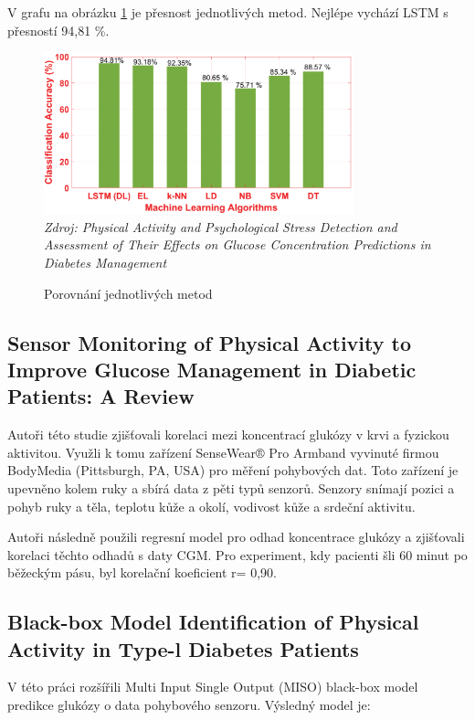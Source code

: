 V grafu na obrázku \ref{fig:analyza:su3} je přesnost jednotlivých metod. Nejlépe vychází LSTM s přesností 94,81 \%.

\begin{figure}[H]
\caption{Porovnání jednotlivých metod}
\label{fig:analyza:su3}
\centering
\includegraphics[width=0.8\textwidth]{img/analyzaPA/su3.png}\\
\textit{Zdroj: Physical Activity and Psychological Stress Detection and Assessment of Their Effects on Glucose Concentration Predictions in Diabetes Management \citep{analyzaPA.SU}}
\end{figure}


\subsection{Sensor Monitoring of Physical Activity to Improve Glucose Management in Diabetic Patients: A Review}
\label{ch:analyza:Review}

Autoři této studie \citet{analyzaPA.Review} zjišťovali korelaci mezi koncentrací glukózy v krvi a fyzickou aktivitou. Využli k tomu zařízení SenseWear® Pro Armband vyvinuté firmou BodyMedia (Pittsburgh, PA, USA) pro měření pohybových dat. Toto zařízení je upevněno kolem ruky a sbírá data z pěti typů senzorů. Senzory snímají pozici a pohyb ruky a těla, teplotu kůže a okolí, vodivost kůže a srdeční aktivitu.

Autoři následně použili regresní model pro odhad koncentrace glukózy a zjišťovali korelaci těchto odhadů s daty CGM. Pro experiment, kdy pacienti šli 60 minut po běžeckým pásu, byl korelační koeficient r= 0,90.


\subsection{Black-box Model Identification of Physical Activity in Type-l Diabetes Patients}

V této práci  \citet{analyzaPA.BlackBox} rozšířili  Multi Input Single Output (MISO) black-box model predikce glukózy o data pohybového senzoru. Výsledný model je:


